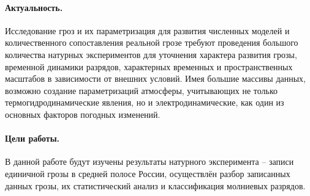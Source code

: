 \documentclass[a4paper,14pt]{extarticle}
\begin{document}
\paragraph{Актуальность.} Исследование гроз и их параметризация для 
развития численных моделей и количественного сопоставления реальной грозе требуют проведения большого количества натурных экспериментов для уточнения характера развития грозы, временной динамики разрядов, 
характерных временных и пространственных масштабов в зависимости от внешних условий. Имея большие массивы данных, возможно создание параметризаций атмосферы, учитывающих не только термогидродинамические явления, но и электродинамические, как один из основных факторов погодных изменений.
\vspace{-1em}
\paragraph{Цели работы.} В данной работе будут изучены результаты натурного эксперимента -- записи единичной грозы в средней полосе России, осуществлён разбор записанных данных грозы, их  статистический анализ и  классификация молниевых разрядов.





% 

\end{document}

